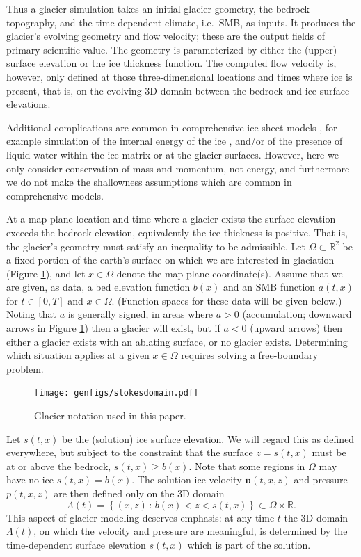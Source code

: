 \documentclass[hidelinks,onefignum,onetabnum,final]{siamart220329}  %
\newcommand{\RR}{\mathbb{R}}
\newcommand{\bu}{\mathbf{u}}
\begin{document}
Thus a glacier simulation takes an initial glacier geometry, the bedrock topography, and the time-dependent climate, i.e.~SMB, as inputs.  It produces the glacier's evolving geometry and flow velocity; these are the output fields of primary scientific value.  The geometry is parameterized by either the (upper) surface elevation or the ice thickness function.  The computed flow velocity is, however, only defined at those three-dimensional locations and times where ice is present, that is, on the evolving 3D domain between the bedrock and ice surface elevations.

Additional complications are common in comprehensive ice sheet models \cite{SchoofHewitt2013}, for example simulation of the internal energy of the ice \cite{Aschwandenetal2012}, and/or of the presence of liquid water within the ice matrix or at the glacier surfaces.  However, here we only consider conservation of mass and momentum, not energy, and furthermore we do not make the shallowness assumptions which are common in comprehensive models.

At a map-plane location and time where a glacier exists the surface elevation exceeds the bedrock elevation, equivalently the ice thickness is positive.  That is, the glacier's geometry must satisfy an inequality to be admissible.  Let $\Omega \subset \RR^2$ be a fixed portion of the earth's surface on which we are interested in glaciation (Figure \ref{fig:stokesdomain}), and let $x\in\Omega$ denote the map-plane coordinate(s).  Assume that we are given, as data, a bed elevation function $b(x)$ and an SMB function $a(t,x)$ for $t\in [0,T]$ and $x\in \Omega$.  (Function spaces for these data will be given below.)  Noting that $a$ is generally signed, in areas where $a>0$ (accumulation; downward arrows in Figure \ref{fig:stokesdomain}) then a glacier will exist, but if $a<0$ (upward arrows) then either a glacier exists with an ablating surface, or no glacier exists.  Determining which situation applies at a given $x\in\Omega$ requires solving a free-boundary problem.

\medskip
\begin{figure}[ht]
\centering
\texttt{[image: genfigs/stokesdomain.pdf]}
\caption{Glacier notation used in this paper.}
\label{fig:stokesdomain}
\end{figure}

\medskip
Let $s(t,x)$ be the (solution) ice surface elevation.  We will regard this as defined everywhere, but subject to the constraint that the surface $z=s(t,x)$ must be at or above the bedrock, $s(t,x) \ge b(x)$.  Note that some regions in $\Omega$ may have no ice $s(t,x)=b(x)$.  The solution ice velocity $\bu(t,x,z)$ and pressure $p(t,x,z)$ are then defined only on the 3D domain
\begin{equation}
\Lambda(t) = \left\{(x,z)\,:\,b(x) < z < s(t,x)\right\} \subset \Omega \times \RR. \label{eq:icydomain}
\end{equation}
This aspect of glacier modeling deserves emphasis: at any time $t$ the 3D domain $\Lambda(t)$, on which the velocity and pressure are meaningful, is determined by the time-dependent surface elevation $s(t,x)$ which is part of the solution.
\end{document}
